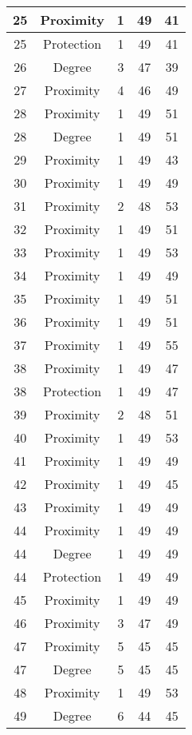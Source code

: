 \documentclass[results.tex]{subfiles}
\begin{document}
\begin{center}
\begin{tabular}{| c || c | c | c | c |}
    \hline
    25 & Proximity & 1 & 49 & 41 \\ 
    \hline
    25 & Protection & 1 & 49 & 41 \\ 
    \hline
    26 & Degree & 3 & 47 & 39 \\ 
    \hline
    27 & Proximity & 4 & 46 & 49 \\ 
    \hline
    28 & Proximity & 1 & 49 & 51 \\ 
    \hline
    28 & Degree & 1 & 49 & 51 \\ 
    \hline
    29 & Proximity & 1 & 49 & 43 \\ 
    \hline
    30 & Proximity & 1 & 49 & 49 \\ 
    \hline
    31 & Proximity & 2 & 48 & 53 \\ 
    \hline
    32 & Proximity & 1 & 49 & 51 \\ 
    \hline
    33 & Proximity & 1 & 49 & 53 \\ 
    \hline
    34 & Proximity & 1 & 49 & 49 \\ 
    \hline
    35 & Proximity & 1 & 49 & 51 \\ 
    \hline
    36 & Proximity & 1 & 49 & 51 \\ 
    \hline
    37 & Proximity & 1 & 49 & 55 \\ 
    \hline
    38 & Proximity & 1 & 49 & 47 \\ 
    \hline
    38 & Protection & 1 & 49 & 47 \\ 
    \hline
    39 & Proximity & 2 & 48 & 51 \\ 
    \hline
    40 & Proximity & 1 & 49 & 53 \\ 
    \hline
    41 & Proximity & 1 & 49 & 49 \\ 
    \hline
    42 & Proximity & 1 & 49 & 45 \\ 
    \hline
    43 & Proximity & 1 & 49 & 49 \\ 
    \hline
    44 & Proximity & 1 & 49 & 49 \\ 
    \hline
    44 & Degree & 1 & 49 & 49 \\ 
    \hline
    44 & Protection & 1 & 49 & 49 \\ 
    \hline
    45 & Proximity & 1 & 49 & 49 \\ 
    \hline
    46 & Proximity & 3 & 47 & 49 \\ 
    \hline
    47 & Proximity & 5 & 45 & 45 \\ 
    \hline
    47 & Degree & 5 & 45 & 45 \\ 
    \hline
    48 & Proximity & 1 & 49 & 53 \\ 
    \hline
    49 & Degree & 6 & 44 & 45 \\ 
    \hline   \end{tabular}
\end{center}
\end{document}
